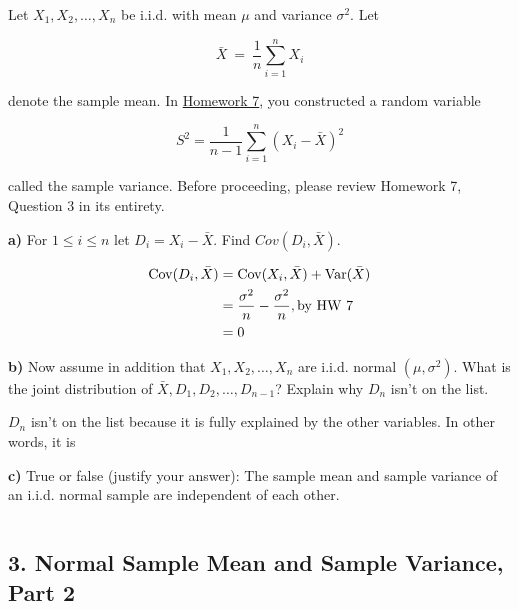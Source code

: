 \documentclass[11pt]{article}
\makeatletter
\newcommand{\boxspacing}{\kern\kvtcb@left@rule\kern\kvtcb@boxsep}
\newcommand{\prompt}[4]{
        {\ttfamily\llap{{\color{#2}[#3]:\hspace{3pt}#4}}\vspace{-\baselineskip}}
    }
\makeatother
\begin{document}
Let \(X_1, X_2, \ldots, X_n\) be i.i.d. with mean \(\mu\) and variance
\(\sigma^2\). Let

\[
\bar{X} ~ = ~ \frac{1}{n} \sum_{i=1}^n X_i
\]

denote the sample mean. In
\href{http://prob140.datahub.berkeley.edu/hub/user-redirect/git-pull?repo=https://github.com/prob140/materials-sp26\&branch=main\&subPath=hw/Homework_07.ipynb}{Homework
7}, you constructed a random variable

\[
S^2 = \frac{1}{n - 1} \sum_{i=1}^n (X_i - \bar{X})^2
\]

called the sample variance. Before proceeding, please review Homework 7,
Question 3 in its entirety.

\textbf{a)} For \(1 \le i \le n\) let \(D_i = X_i - \bar{X}\). Find
\(Cov(D_i, \bar{X})\).

\begin{align*}
	\operatorname{Cov}(D_{i}, \bar X) &= \operatorname{Cov}(X_{i}, \bar X) + \operatorname{Var}(\bar X) \\
			    &= \frac{\sigma^{2}}{n} - \frac{\sigma^{2}}{n}, \text{by HW 7} \\
			    &= 0 \\
\end{align*}




\textbf{b)} Now assume in addition that \(X_1, X_2, \ldots, X_n\) are
i.i.d. normal \((\mu, \sigma^2)\). What is the joint distribution of
\(\bar{X}, D_1, D_2, \ldots, D_{n-1}\)? Explain why \(D_n\) isn't on the
list.


$D_{n}$ isn't on the list because it is fully explained by the other variables. In other words, it is 


\textbf{c)} True or false (justify your answer): The sample mean and
sample variance of an i.i.d. normal sample are independent of each
other.

    \begin{tcolorbox}[breakable, size=fbox, boxrule=1pt, pad at break*=1mm,colback=cellbackground, colframe=cellborder]
\prompt{In}{incolor}{ }{\boxspacing}
\begin{Verbatim}[commandchars=\\\{\}]

\end{Verbatim}
\end{tcolorbox}

    \newpage

    \hypertarget{normal-sample-mean-and-sample-variance-part-2}{%
\subsection{3. Normal Sample Mean and Sample Variance, Part
2}\label{normal-sample-mean-and-sample-variance-part-2}}
\end{document}
